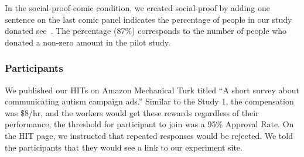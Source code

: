 
In the social-proof-comic condition, we created social-proof by adding one sentence on the last comic panel indicates the percentage of people in our study donated see~. The percentage (87\%) corresponds to the number of people who donated a non-zero amount in the pilot study.


\subsubsection{Participants}
We published our HITs on Amazon Mechanical Turk titled ``A short survey about communicating autism campaign ads.'' Similar to the Study 1, the compensation was \$8/hr, and the workers would get these rewards regardless of their performance, the threshold for participant to join was a 95\% Approval Rate. On the HIT page, we instructed that repeated responses would be rejected. We told the participants that they would see a link to our experiment site.
